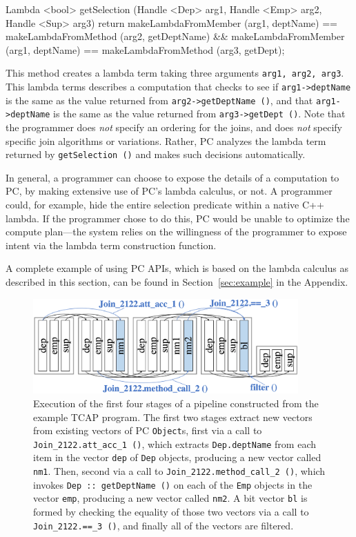 \begin{codesmall} 
Lambda <bool> getSelection (Handle <Dep> arg1, Handle <Emp> arg2, Handle <Sup> arg3) {
	return makeLambdaFromMember (arg1, deptName) == 
	       makeLambdaFromMethod (arg2, getDeptName) &&
	       makeLambdaFromMember (arg1, deptName) == 
               makeLambdaFromMethod (arg3, getDept);   }
\end{codesmall}

\noindent
This method creates a lambda term taking three arguments \texttt{arg1, arg2, arg3}.  This lambda terms describes a computation that
checks to see if \texttt{arg1->deptName} is the same as the value returned from \texttt{arg2->getDeptName ()}, and
that \texttt{arg1->deptName} is the same as the value returned from \texttt{arg3}\-\texttt{->getDept ()}. 
Note that the programmer does \emph{not} specify an ordering for the joins, and does \emph{not} specify specific join algorithms or variations.  Rather, PC
analyzes the lambda term returned by \texttt{getSelection ()} and
makes such decisions automatically.

In general, a programmer can choose to expose the details of a computation to PC, by making extensive use of PC's lambda
calculus, or not.  A programmer could, for example, hide the entire selection predicate within a native C++ lambda.
If the programmer chose to do this, PC would be unable to optimize the compute plan---the system relies on the willingness of the 
programmer to expose intent via the lambda term construction function.

\vspace{5pt}
A complete example of using PC APIs, which is based on the lambda
calculus as described in this section, can be found in
Section~\ref{sec:example} in the Appendix.

\begin{figure}[t]
  \begin{center}
    \includegraphics[width=4in]{TCAP}
  \end{center}
  \caption{Execution of the first four stages of a pipeline constructed from the example TCAP program.  The first two stages extract new vectors from 
existing vectors of PC \texttt{Object}s, first via a call to \texttt{Join\_2122.att\_acc\_1 ()}, which extracts \texttt{Dep.deptName} from each item in the vector
\texttt{dep} 
of \texttt{Dep} objects, producing a new vector called \texttt{nm1}. Then, second
via a call to \texttt{Join\_2122.method\_call\_2 ()}, which invokes \texttt{Dep :: getDeptName ()} on each of the \texttt{Emp} objects
in the vector \texttt{emp}, producing a new vector called \texttt{nm2}.  A bit vector \texttt{bl} is formed by checking the equality of those two 
vectors via a call to \texttt{Join\_2122.==\_3 ()}, and finally all of the vectors are filtered.}
  \label{fig:TCAP}
\end{figure}



